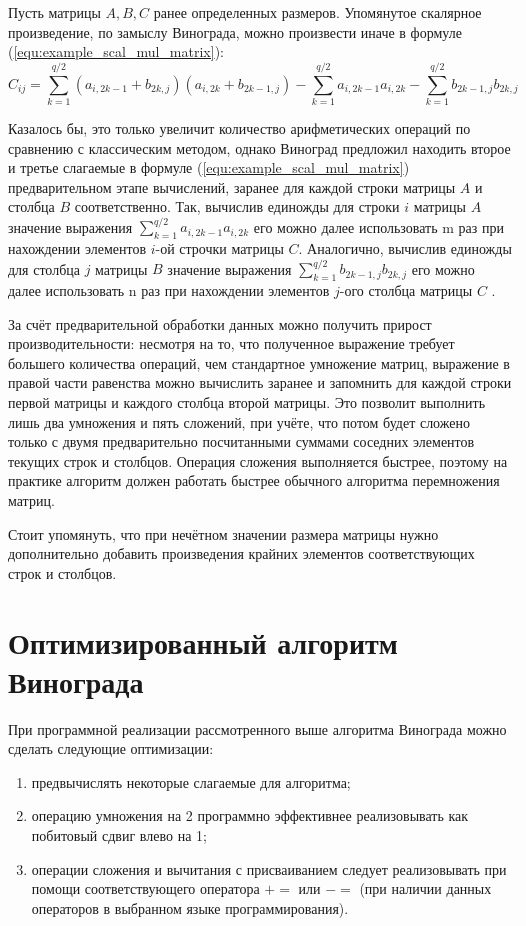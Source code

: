 Пусть матрицы $A, B, C$ ранее определенных размеров. Упомянутое скалярное произведение, по замыслу Винограда, можно произвести иначе в формуле (\ref{equ:example_scal_mul_matrix}):
\begin{equation} 
	\label{equ:example_scal_mul_matrix}
	C_{ij} = \sum_{k=1}^{q/2}(a_{i,2k-1} + b_{2k,j})(a_{i,2k} + b_{2k-1,j}) - \sum_{k=1}^{q/2} a_{i,2k-1}a_{i,2k} - \sum_{k=1}^{q/2} b_{2k-1,j}b_{2k,j}
\end{equation}

Казалось бы, это только увеличит количество арифметических операций по сравнению с классическим методом, однако Виноград предложил находить второе и третье слагаемые в формуле (\ref{equ:example_scal_mul_matrix}) предварительном этапе вычислений, заранее для каждой строки матрицы $A$ и столбца $B$ соответственно. Так, вычислив единожды для строки $i$ матрицы $A$ значение выражения $\sum_{k=1}^{q/2}a_{i,2k-1}a_{i,2k}$ его можно далее использовать m раз при нахождении элементов $i$-ой строчки матрицы $C$. Аналогично, вычислив единожды для
столбца $j$ матрицы $B$ значение выражения $\sum_{k=1}^{q/2} b_{2k-1,j}b_{2k,j}$ его можно
далее использовать n раз при нахождении элементов $j$-ого столбца матрицы $C$ \cite{book_vinograd}.

За счёт предварительной обработки данных можно получить прирост производительности: несмотря на то, что полученное выражение требует большего количества операций, чем стандартное умножение матриц, выражение в правой части равенства можно вычислить заранее и запомнить для каждой строки первой матрицы и каждого столбца второй матрицы. Это позволит выполнить лишь два умножения и пять сложений, при учёте, что потом будет сложено только с двумя предварительно посчитанными суммами соседних элементов текущих строк и столбцов. Операция сложения выполняется
быстрее, поэтому на практике алгоритм должен работать быстрее обычного алгоритма перемножения матриц.

Стоит упомянуть, что при нечётном значении размера матрицы нужно дополнительно добавить произведения крайних элементов соответствующих строк и столбцов.

\section{Оптимизированный алгоритм Винограда}

При программной реализации рассмотренного выше алгоритма Винограда можно сделать следующие оптимизации:
\begin{enumerate}[label=\arabic*)]
	\item предвычислять некоторые слагаемые для алгоритма;
	\item операцию умножения на 2 программно эффективнее реализовывать как побитовый сдвиг влево на 1;
	\item операции сложения и вычитания с присваиванием следует реализовывать при помощи соответствующего оператора $+=$ или $-=$ (при наличии данных операторов в выбранном языке программирования).
\end{enumerate}

